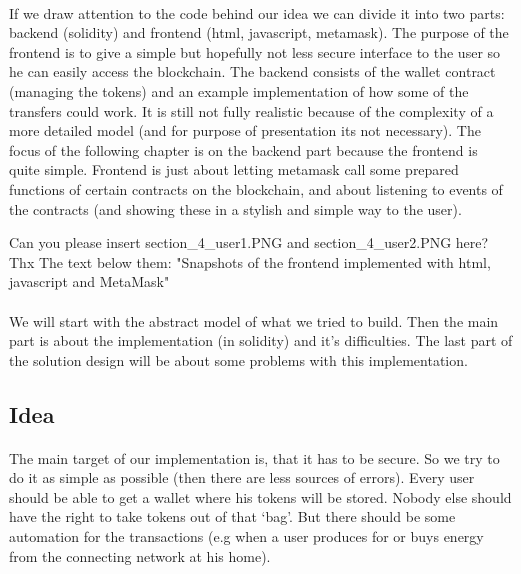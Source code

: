 \documentclass{scrartcl}
\begin{document}
   \paragraph{}
   If we draw attention to the code behind our idea we can divide it into two parts: backend (solidity) and frontend (html, javascript, metamask). The purpose of the frontend is to give a simple but hopefully not less secure interface to the user so he can easily access the blockchain. The backend consists of the wallet contract (managing the tokens) and an example implementation of how some of the transfers could work. It is still not fully realistic because of the complexity of a more detailed model (and for purpose of presentation its not necessary). The focus of the following chapter is on the backend part because the frontend is quite simple. Frontend is just about letting metamask call some prepared functions of certain contracts on the blockchain, and about listening to events of the contracts (and showing these in a stylish and simple way to the user).
   
   \throwError
   Can you please insert section_4_user1.PNG and section_4_user2.PNG here? Thx
   The text below them: "Snapshots of the frontend implemented with html, javascript and MetaMask"
   
   \paragraph{}
   We will start with the abstract model of what we tried to build. Then the main part is about the implementation (in solidity) and it’s difficulties. The last part of the solution design will be about some problems with this implementation.
   
\subsection{Idea}
   
   \paragraph{}
   The main target of our implementation is, that it has to be secure. So we try to do it as simple as possible (then there are less sources of errors). Every user should be able to get a wallet where his tokens will be stored. Nobody else should have the right to take tokens out of that ‘bag’. But there should be some automation for the transactions (e.g when a user produces for or buys energy from the connecting network at his home).
	
\end{document}
